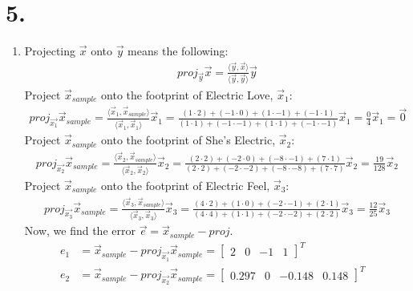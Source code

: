 \documentclass[11pt]{article}
\newenvironment{qparts}{\begin{enumerate}[{(}a{)}]}{\end{enumerate}}
\begin{document}
\newpage
\section*{5.}
\begin{qparts}
\item
Projecting $\vec{x}$ onto $\vec{y}$ means the following:
\begin{align*}
    proj_{\vec{y}}\vec{x} = \frac{\langle \vec{y}, \vec{x} \rangle}{\langle \vec{y}, \vec{y} \rangle}\vec{y}
\end{align*}
Project $\vec{x}_{sample}$ onto the footprint of Electric Love, $\vec{x}_1$:
\begin{align*}
    proj_{\vec{x_1}}\vec{x}_{sample} = \frac{\langle \vec{x}_1, \vec{x}_{sample} \rangle}{\langle \vec{x}_1, \vec{x}_1 \rangle} \vec{x}_1 =
    \frac{(1 \cdot 2) + (-1 \cdot 0) + (1 \cdot -1) + (-1 \cdot 1)}{(1 \cdot 1) + (-1 \cdot -1) + (1 \cdot 1) + (-1 \cdot -1)} \vec{x}_1= 
    \frac{0}{4}\vec{x}_1 = \vec{0}
\end{align*}
Project $\vec{x}_{sample}$ onto the footprint of She's Electric, $\vec{x}_2$:
\begin{align*}
    proj_{\vec{x_2}}\vec{x}_{sample} = \frac{\langle \vec{x}_2, \vec{x}_{sample} \rangle}{\langle \vec{x}_2, \vec{x}_2 \rangle} \vec{x}_2 =
    \frac{(2 \cdot 2) + (-2 \cdot 0) + (-8 \cdot -1) + (7 \cdot 1)}{(2 \cdot 2) + (-2 \cdot -2) + (-8 \cdot -8) + (7 \cdot 7)} \vec{x}_2= 
    \frac{19}{128}\vec{x}_2
\end{align*}
Project $\vec{x}_{sample}$ onto the footprint of Electric Feel, $\vec{x}_3$:
\begin{align*}
    proj_{\vec{x_3}}\vec{x}_{sample} = \frac{\langle \vec{x}_3, \vec{x}_{sample} \rangle}{\langle \vec{x}_3, \vec{x}_3 \rangle} \vec{x}_3 =
    \frac{(4 \cdot 2) + (1 \cdot 0) + (-2 \cdot -1) + (2 \cdot 1)}{(4 \cdot 4) + (1 \cdot 1) + (-2 \cdot -2) + (2 \cdot 2)} \vec{x}_3= 
    \frac{12}{25}\vec{x}_3
\end{align*}
Now, we find the error $\vec{e} = \vec{x}_{sample} - proj$.
\begin{align*}
    e_1 &= \vec{x}_{sample} - proj_{\vec{x_1}}\vec{x}_{sample} = \begin{bmatrix}2&0&-1&1\end{bmatrix}^T& \\
    e_2 &= \vec{x}_{sample} - proj_{\vec{x_2}}\vec{x}_{sample} = \begin{bmatrix}0.297&0& -0.148& 0.148\end{bmatrix}^T& \\

\end{align*}
\end{qparts}
\end{document}
